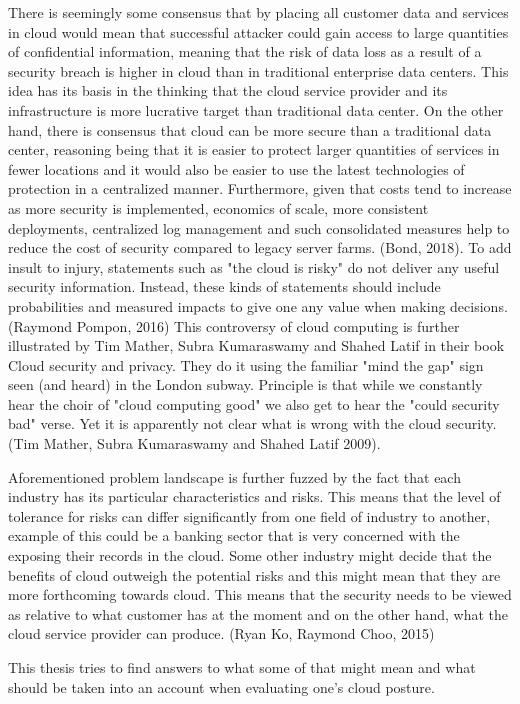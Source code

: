 \documentclass{article}
\begin{document}
There is seemingly some consensus that by placing all customer data and services in cloud would mean that successful attacker could gain access to large quantities of confidential information, meaning that the risk of data loss as a result of a security breach is higher in cloud than in traditional enterprise data centers. This idea has its basis in the thinking that the cloud service provider and its infrastructure is more lucrative target than traditional data center. On the other hand, there is consensus that cloud can be more secure than a traditional data center, reasoning being that it is easier to protect larger quantities of services in fewer locations and it would also be easier to use the latest technologies of protection in a centralized manner. Furthermore, given that costs tend to increase as more security is implemented, economics of scale, more consistent deployments, centralized log management and such consolidated measures help to reduce the cost of security compared to legacy server farms. (Bond, 2018). To add insult to injury, statements such as "the cloud is risky" do not deliver any useful security information. Instead, these kinds of statements should include probabilities and measured impacts to give one any value when making decisions.(Raymond Pompon, 2016) 
This controversy of cloud computing is further illustrated by Tim Mather, Subra Kumaraswamy and Shahed Latif in their book Cloud security and privacy. They do it using the familiar "mind the gap" sign seen (and heard) in the London subway. Principle is that while we constantly hear the choir of "cloud computing good" we also get to hear the "could security bad" verse. Yet it is apparently not clear what is wrong with the cloud security.(Tim Mather, Subra Kumaraswamy and Shahed Latif 2009).
\par
Aforementioned problem landscape is further fuzzed by the fact that each industry has its particular characteristics and risks. This means that the level of tolerance for risks can differ significantly from one field of industry to another, example of this could be a banking sector that is very concerned with the exposing their records in the cloud. Some other industry might decide that the benefits of cloud outweigh the potential risks and this might mean that they are more forthcoming towards cloud. This means that the security needs to be viewed as relative to what customer has at the moment and on the other hand, what the cloud service provider can produce. (Ryan Ko, Raymond Choo, 2015)
\par
This thesis tries to find answers to what some of that might mean and what should be taken into an account when evaluating one's cloud posture.
\end{document}
